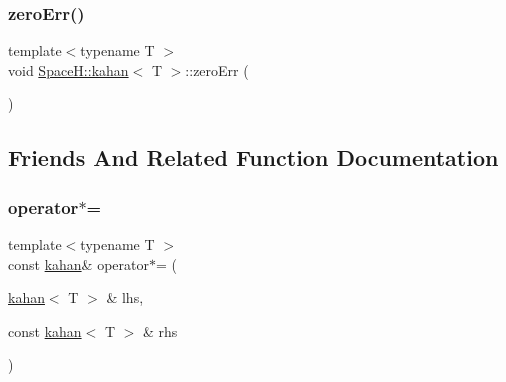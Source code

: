 \mbox{\label{struct_space_h_1_1kahan_a2e4b2e324e738455f7ff545137993a4a}} 
\subsubsection{\texorpdfstring{zero\+Err()}{zeroErr()}}
{\footnotesize\ttfamily template$<$typename T $>$ \\
void \mbox{\hyperlink{struct_space_h_1_1kahan}{Space\+H\+::kahan}}$<$ T $>$\+::zero\+Err (\begin{DoxyParamCaption}{ }\end{DoxyParamCaption})\hspace{0.3cm}{\ttfamily [inline]}}



\subsection{Friends And Related Function Documentation}
\mbox{\label{struct_space_h_1_1kahan_a23bc801f60370bf8a564989c7cf5da03}} 
\subsubsection{\texorpdfstring{operator$\ast$=}{operator*=}}
{\footnotesize\ttfamily template$<$typename T $>$ \\
const \mbox{\hyperlink{struct_space_h_1_1kahan}{kahan}}\& operator$\ast$= (\begin{DoxyParamCaption}\item[{\mbox{\hyperlink{struct_space_h_1_1kahan}{kahan}}$<$ T $>$ \&}]{lhs,  }\item[{const \mbox{\hyperlink{struct_space_h_1_1kahan}{kahan}}$<$ T $>$ \&}]{rhs }\end{DoxyParamCaption})\hspace{0.3cm}{\ttfamily [friend]}}

\mbox{\label{struct_space_h_1_1kahan_a8183a5443769b1b64ab323558a4700fd}} 

